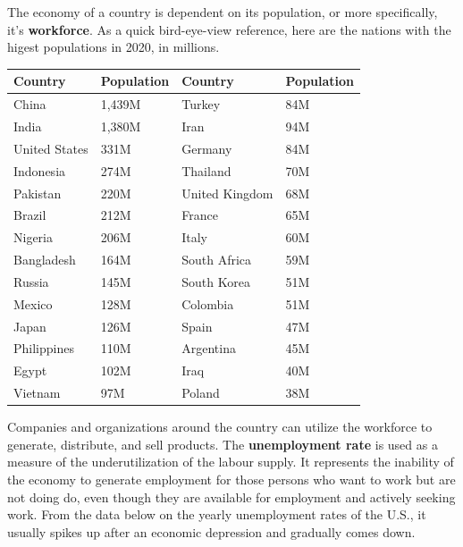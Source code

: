\documentclass{article}
\begin{document}
  The economy of a country is dependent on its population, or more specifically, it's \textbf{workforce}. As a quick bird-eye-view reference, here are the nations with the higest populations in 2020, in millions.

  \begin{table}[H]
    \begin{tabular}{llll}
    \hline
    Country & Population & Country & Population \\
    \hline
    China & 1,439M & Turkey & 84M \\
    India & 1,380M & Iran & 94M \\
    United States & 331M & Germany & 84M \\
    Indonesia & 274M & Thailand & 70M \\
    Pakistan & 220M & United Kingdom & 68M \\
    Brazil & 212M & France & 65M \\
    Nigeria & 206M & Italy & 60M \\
    Bangladesh & 164M & South Africa & 59M \\
    Russia & 145M & South Korea & 51M \\
    Mexico & 128M & Colombia & 51M \\
    Japan & 126M & Spain & 47M \\
    Philippines & 110M & Argentina & 45M \\
    Egypt & 102M & Iraq & 40M \\
    Vietnam & 97M & Poland & 38M \\
    \hline
    \end{tabular}
  \end{table}

  Companies and organizations around the country can utilize the workforce to generate, distribute, and sell products. The \textbf{unemployment rate} is used as a measure of the underutilization of the labour supply. It represents the inability of the economy to generate employment for those persons who want to work but are not doing do, even though they are available for employment and actively seeking work. From the data below on the yearly unemployment rates of the U.S., it usually spikes up after an economic depression and gradually comes down.
\end{document}
